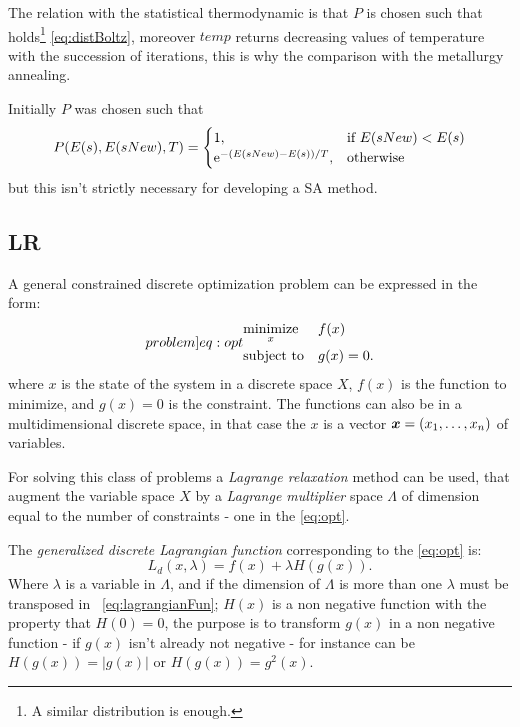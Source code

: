 \documentclass[dissertation.tex]{subfiles}
\begin{document}
The relation with the statistical thermodynamic is that $P$ is chosen
such that holds\footnote{A similar distribution is enough.}
\cref{eq:distBoltz}, moreover $temp$ returns decreasing values of
temperature with the succession of iterations, this is why the
comparison with the metallurgy annealing.

Initially $P$ was chosen such that
\begin{equation*}
  P(E(s), E(sNew), T)=
  \begin{cases}
    1,& \text{if }E(sNew)<E(s)\\
    \mathrm{e}^{-(E(sNew)-E(s))/T},& \text{otherwise}
  \end{cases}
\end{equation*}
but this isn't strictly necessary for developing a \ac{SA} method.

\subsection{\acf{LR}}\label{sec:lagrangianRelaxation}
A general constrained discrete optimization problem can be expressed in
the form:
\begin{equation}\label[problem]{eq:opt}
\begin{aligned}
& \underset{x}{\text{minimize}}
& & f(x) \\
& \text{subject to}
& & g(x)=0.
\end{aligned}
\end{equation}
where $x$ is the state of the system in a discrete space $X$, $f(x)$
is the function to
minimize, and $g(x)=0$ is the constraint. The functions can also be
in a multidimensional discrete space, in that case the $x$ is a vector
$\boldsymbol{x}=(x_1,\dots,x_n)$ of variables.

For solving this class
of problems a \emph{Lagrange relaxation} method can be used, that
augment the variable space $X$ by a \emph{Lagrange multiplier} space
$\Lambda$ of dimension equal to the number of constraints - one in the
\cref{eq:opt}.

The \emph{generalized discrete Lagrangian
  function} corresponding to the \cref{eq:opt} is:
\begin{equation}\label{eq:lagrangianFun}
  L_d(x,\lambda)=f(x)+\lambda H(g(x)).
\end{equation}
Where $\lambda$ is a variable in $\Lambda$, and if the dimension of
$\Lambda$ is more than one $\lambda$ must be transposed in
~\cref{eq:lagrangianFun}; $H(x)$ is a non negative function
with the property that $H(0)=0$, the purpose is to transform $g(x)$ in
a non negative function - if $g(x)$ isn't already not negative - for
instance can be $H(g(x))=|g(x)|$ or $H(g(x))=g^2(x)$.
\end{document}
